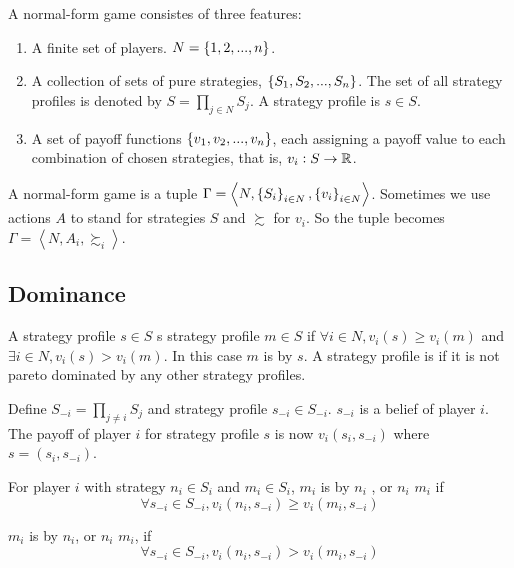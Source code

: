 \begin{definition}
    A normal-form game consistes of three features:
    \begin{enumerate}
        \item A finite set of players. $N = \set{1, 2, ... , n}$.
        \item A collection of sets of pure strategies, $\set{S_1, S_2, ... , S_n}$. The set of all strategy profiles is denoted by $\displaystyle S = \prod_{j \in N} S_j$. A strategy profile is $s \in S$.
        \item A set of payoff functions $\set{v_1, v_2, ..., v_n}$, each assigning a payoff value to each combination of chosen strategies, that is, $\displaystyle v_i : S \rightarrow \mathbb{R} $.
    \end{enumerate}
    
    A normal-form game is a tuple $\Gamma = \left\langle N, \set{S_i}_{i \in N}, \set{v_i}_{i \in N} \right\rangle$. Sometimes we use actions $A$ to stand for strategies $S$ and $\succsim$ for $v_i$. So the tuple becomes $\Gamma = \left\langle N, A_i, \succsim_i \right\rangle$.
\end{definition}

\subsection{Dominance}

\begin{definition}
    A strategy profile $s \in S$ s strategy profile $m \in S$ if $\forall i \in N, v_i(s) \geq v_i(m)$ and $\exists i \in N, v_i(s) > v_i(m)$. In this case $m$ is  by $s$. A strategy profile is  if it is not pareto dominated by any other strategy profiles.
\end{definition}

\begin{definition}
    Define $\displaystyle S_{-i} = \prod_{j \neq i} S_j$ and strategy profile $s_{-i} \in S_{-i}$. $s_{-i}$ is a belief of player $i$. The payoff of player $i$ for strategy profile $s$ is now $v_i(s_i, s_{-i})$ where $s = (s_i, s_{-i})$.
\end{definition}

\begin{definition}
    For player $i$ with strategy $n_i \in S_i$ and $m_i \in S_i$, $m_i$ is  by $n_i$ , or $n_i$ \cindex{$\succeq$} $m_i$ if 
    \begin{equation*}
       \forall s_{-i} \in S_{-i}, v_i (n_i, s_{-i}) \geq v_i (m_i, s_{-i})
    \end{equation*}
    
    $m_i$ is  by $n_i$, or $n_i$ \cindex{$\succ$} $m_i$, if 
    \begin{equation*}
       \forall s_{-i} \in S_{-i}, v_i (n_i, s_{-i}) > v_i (m_i, s_{-i})
    \end{equation*}
\end{definition}

